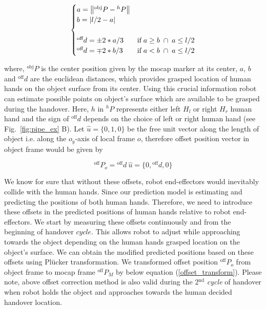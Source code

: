 
\begin{equation}\label{hand rel pos on obj}
\centering
\begin{cases}
a = \norm{{}^\text{obj}{P} - {}^{h}{P}} & \text{}  \\

b = \abs{l/2 - a}  & \text{} \\
\\
{}^\text{off}{d} = \pm 2*a/3 &  \text{if} \; a \geq b \; \cap \; a\leq l/2\\

{}^\text{off}{d} = \mp 2*b/3 &  \text{if} \; a < b \; \cap \; a\leq l/2\\
\end{cases}
\end{equation}

where, ${}^\text{obj}{P}$ is the center position given by the mocap marker at its center, $a$, $b$ and ${}^\text{off}{d}$ are the euclidean distances, which provides grasped location of human hands on the object surface from its center. Using this crucial information robot can estimate possible points on object's surface which are available to be grasped during the handover. Here, $h$ in ${}^{h}{P}$ represents either left $H_l$ or right $H_r$ human hand and the sign of ${}^\text{off}{d}$ depends on the choice of left or right human hand (see Fig.~\ref{fig:pipe_ex} B). Let $\hat{u} = \{0, 1, 0\}$ be the free unit vector along the length of object i.e. along the $o_y$-axis of local frame $o$, therefore offset position vector in object frame would be given by

\begin{equation}
	{}^\text{off}{P}_{o} = {}^\text{off}{d} \: \hat{u}  =  \{0, {}^\text{off}{d}, 0\}
\end{equation}


We know for sure that without these offsets, robot end-effectors would inevitably collide with the human hands. Since our prediction model is estimating and predicting the positions of both human hands. Therefore, we need to introduce these offsets in the predicted positions of human hands relative to robot end-effectors. We start by measuring these offsets continuously and from the beginning of handover $\textit{cycle}$. This allows robot to adjust while approaching towards the object depending on the human hands grasped location on the object's surface. We can obtain the modified predicted positions based on these offsets using Pl\"ucker transformation. We transformed offset position ${}^\text{off}{P}_{o}$ from object frame to mocap frame ${}^\text{off}{P}_{M}$ by below equation (\ref{offset_transform}). Please note, above offset correction method is also valid during the 2$^\text{nd}$ \textit{cycle} of handover when robot holds the object and approaches towards the human decided handover location.


